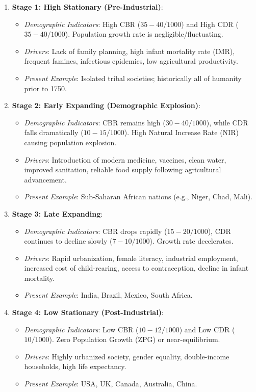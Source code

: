 \documentclass[11pt,a4paper]{article}
\begin{document}
\begin{enumerate}[leftmargin=*]
  \item \textbf{Stage 1: High Stationary (Pre-Industrial)}:
  \begin{itemize}
    \item \textit{Demographic Indicators}: High CBR ($35-40/1000$) and High CDR ($35-40/1000$). Population growth rate is negligible/fluctuating.
    \item \textit{Drivers}: Lack of family planning, high infant mortality rate (IMR), frequent famines, infectious epidemics, low agricultural productivity.
    \item \textit{Present Example}: Isolated tribal societies; historically all of humanity prior to 1750.
  \end{itemize}

  \item \textbf{Stage 2: Early Expanding (Demographic Explosion)}:
  \begin{itemize}
    \item \textit{Demographic Indicators}: CBR remains high ($30-40/1000$), while CDR falls dramatically ($10-15/1000$). High Natural Increase Rate (NIR) causing population explosion.
    \item \textit{Drivers}: Introduction of modern medicine, vaccines, clean water, improved sanitation, reliable food supply following agricultural advancement.
    \item \textit{Present Example}: Sub-Saharan African nations (e.g., Niger, Chad, Mali).
  \end{itemize}

  \item \textbf{Stage 3: Late Expanding}:
  \begin{itemize}
    \item \textit{Demographic Indicators}: CBR drops rapidly ($15-20/1000$), CDR continues to decline slowly ($7-10/1000$). Growth rate decelerates.
    \item \textit{Drivers}: Rapid urbanization, female literacy, industrial employment, increased cost of child-rearing, access to contraception, decline in infant mortality.
    \item \textit{Present Example}: India, Brazil, Mexico, South Africa.
  \end{itemize}

  \item \textbf{Stage 4: Low Stationary (Post-Industrial)}:
  \begin{itemize}
    \item \textit{Demographic Indicators}: Low CBR ($10-12/1000$) and Low CDR ($10/1000$). Zero Population Growth (ZPG) or near-equilibrium.
    \item \textit{Drivers}: Highly urbanized society, gender equality, double-income households, high life expectancy.
    \item \textit{Present Example}: USA, UK, Canada, Australia, China.
  \end{itemize}


\end{enumerate}
\end{document}
